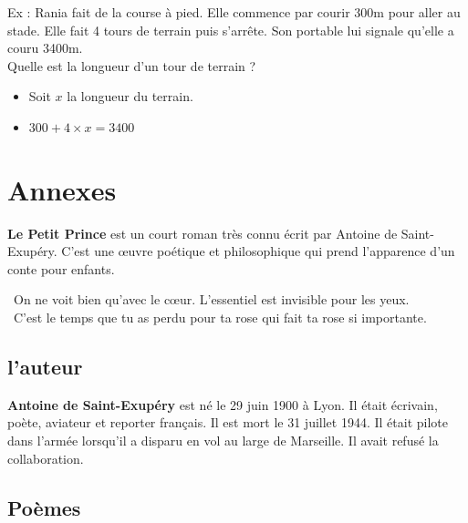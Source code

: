 Ex : Rania fait de la course à pied. Elle commence par courir 300m pour aller au stade. Elle fait 4 tours de terrain puis s'arrête. Son portable lui signale qu'elle a couru 3400m. \\
Quelle est la longueur d'un tour de terrain ?

\begin{itemize}[label={$\bullet$}]
  \item Soit $x$ la longueur du terrain.
  \item $300 + 4 \times x = 3400$
\end{itemize}

\newpage 

\section*{Annexes}

\newpage 

\textbf{Le Petit Prince} est un court roman très connu écrit par Antoine de Saint-Exupéry. 
C'est une œuvre poétique et philosophique qui prend l'apparence d'un conte pour enfants. 

\begin{center}
  {\selectfont \og On ne voit bien qu'avec le cœur. L'essentiel est invisible pour les yeux. \fg }\\
  {\selectfont \og C'est le temps que tu as perdu pour ta rose qui fait ta rose si importante. \fg}\\

\end{center}

\subsection*{l’auteur}
\textbf{Antoine de Saint-Exupéry} est né le 29 juin 1900 à Lyon. Il était  écrivain, poète, aviateur et reporter français. Il est mort le 31 juillet 1944. Il était pilote dans l’armée lorsqu’il a disparu en vol au large de Marseille. Il avait refusé la collaboration.

\subsection*{Poèmes}

